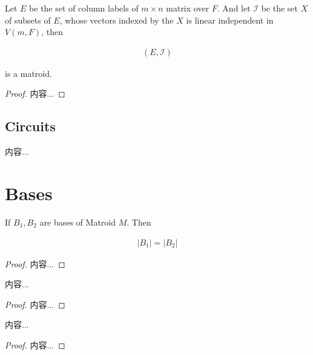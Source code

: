 \documentclass[Total.tex]{subfiles}
\begin{document}
			
		
			
			\begin{proposition}
				Let $E$ be the set of column labels of $m\times n$ matrix over $F$. And let $\mathcal{I}$ be the set $X$ of subsets of $E$, whose vectors indexed by the $X$ is linear independent in $V(m,F)$, then 
				
				\begin{gather*}
					(E,\mathcal{I})
				\end{gather*}
				
				is a matroid.
			\end{proposition}
			
			\begin{proof}
				内容...
			\end{proof}
			
			\subsection{Circuits}
			
			\begin{Def}
				内容...
			\end{Def}
		\section{Bases}
			
			\begin{lemma}
				If $B_1,B_2$ are bases of Matroid $M$. Then
				
				\begin{gather*}
					|B_1|=|B_2|
				\end{gather*}
			\end{lemma}
			
			\begin{proof}
				内容...
			\end{proof}
			
			\begin{lemma}
				内容...
			\end{lemma}
			
			\begin{proof}
				内容...
			\end{proof}
			
			\begin{theorem}
				内容...
			\end{theorem}
			
			\begin{proof}
				内容...
			\end{proof}
			
\end{document}
